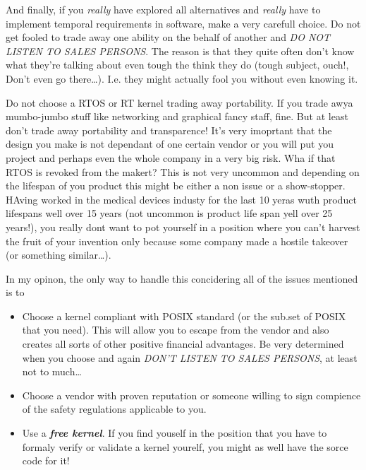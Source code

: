 And finally, if you \textit{really} have explored all alternatives and \textit{really} have to implement temporal requirements in software, make a very carefull choice. Do not get fooled to trade away one ability on the behalf of another and \textit{DO NOT LISTEN TO SALES PERSONS}. The reason is that they quite often don't know what they're talking about even tough the think they do (tough subject, ouch!, Don't even go there\ldots). I.e. they might actually fool you without even knowing it.

Do not choose a RTOS or RT kernel trading away portability. If you trade awya mumbo-jumbo stuff like networking and graphical fancy staff, fine. But at least don't trade away portability and transparence! It's very imoprtant that the design you make is not dependant of one certain vendor or you will put you project and perhaps even the whole company in a very big risk. Wha if that RTOS is revoked from the makert? This is not very uncommon and depending on the lifespan of you product this might be either a non issue or a show-stopper. HAving worked in the medical devices industy for the last 10 yeras wuth product lifespans well over 15 years (not uncommon is product life span yell over 25 years!), you really dont want to pot yourself in a position where you can't harvest the fruit of your invention only because some company made a hostile takeover (or something similar\ldots).

In my opinon, the only way to handle this concidering all of the issues mentioned is to
\begin{itemize}
\item Choose a kernel compliant with POSIX standard (or the sub.set of POSIX that you need). This will allow you to escape from the vendor and also creates all sorts of other positive financial advantages. Be very determined when you choose and again \textit{DON'T LISTEN TO SALES PERSONS}, at least not to much\ldots
\item Choose a vendor with proven reputation or someone willing to sign compience of the safety regulations applicable to you.
\item Use a \textit{\textbf{free kernel}}. If you find youself in the position that you have to formaly verify or validate a kernel yourelf, you might as well have the sorce code for it!
\end{itemize}
